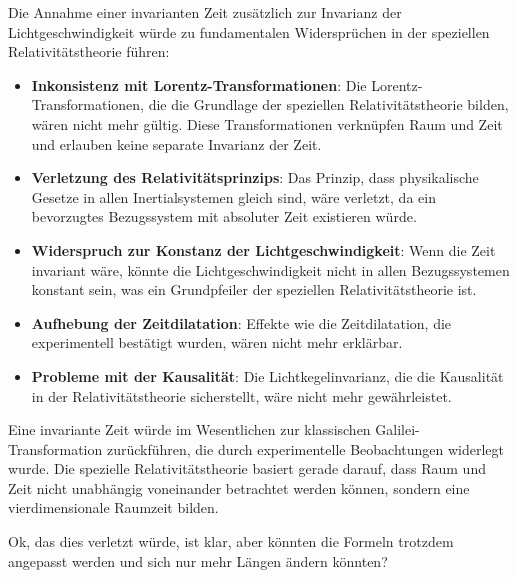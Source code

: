\documentclass[a4paper,12pt]{article}
\begin{document}
	Die Annahme einer invarianten Zeit zusätzlich zur Invarianz der Lichtgeschwindigkeit würde zu fundamentalen Widersprüchen in der speziellen Relativitätstheorie führen:
	\begin{itemize}
		\item \textbf{Inkonsistenz mit Lorentz-Transformationen}: Die Lorentz-Transformationen, die die Grundlage der speziellen Relativitätstheorie bilden, wären nicht mehr gültig. Diese Transformationen verknüpfen Raum und Zeit und erlauben keine separate Invarianz der Zeit.
		\item \textbf{Verletzung des Relativitätsprinzips}: Das Prinzip, dass physikalische Gesetze in allen Inertialsystemen gleich sind, wäre verletzt, da ein bevorzugtes Bezugssystem mit absoluter Zeit existieren würde.
		\item \textbf{Widerspruch zur Konstanz der Lichtgeschwindigkeit}: Wenn die Zeit invariant wäre, könnte die Lichtgeschwindigkeit nicht in allen Bezugssystemen konstant sein, was ein Grundpfeiler der speziellen Relativitätstheorie ist.
		\item \textbf{Aufhebung der Zeitdilatation}: Effekte wie die Zeitdilatation, die experimentell bestätigt wurden, wären nicht mehr erklärbar.
		\item \textbf{Probleme mit der Kausalität}: Die Lichtkegelinvarianz, die die Kausalität in der Relativitätstheorie sicherstellt, wäre nicht mehr gewährleistet.
	\end{itemize}
	Eine invariante Zeit würde im Wesentlichen zur klassischen Galilei-Transformation zurückführen, die durch experimentelle Beobachtungen widerlegt wurde. Die spezielle Relativitätstheorie basiert gerade darauf, dass Raum und Zeit nicht unabhängig voneinander betrachtet werden können, sondern eine vierdimensionale Raumzeit bilden.
	
	Ok, das dies verletzt würde, ist klar, aber könnten die Formeln trotzdem angepasst werden und sich nur mehr Längen ändern könnten?
	
\end{document}
